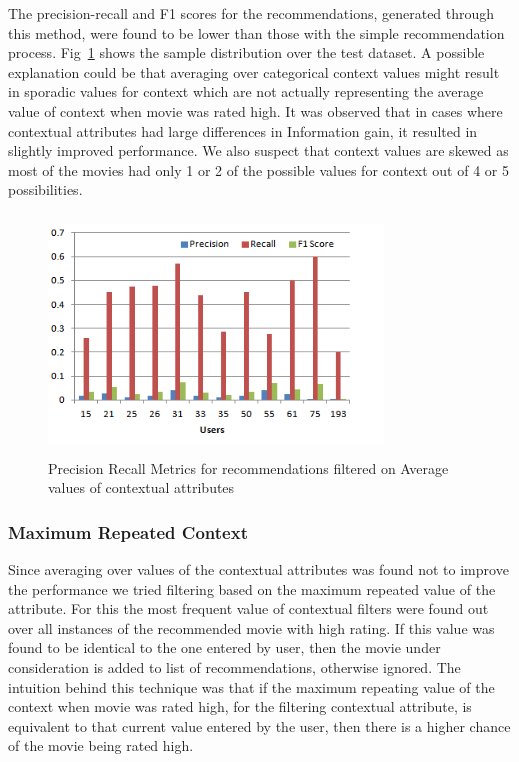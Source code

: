 \documentclass{article}
\begin{document}
The precision-recall and F1 scores for the recommendations, generated through this method, were found to be lower than those with the simple recommendation process. Fig~\ref{precrecallavg} shows the sample distribution over the test dataset. A possible explanation could be that averaging over categorical context values might result in sporadic values for context which are not actually representing the average value of context when movie was rated high. It was observed that in cases where contextual attributes had large differences in Information gain, it resulted in slightly improved performance. We also suspect that context values are skewed as most of the movies had only 1 or 2 of the possible values for context out of 4 or 5 possibilities.\\

\begin{figure}[H]
\includegraphics[height=2.5in, width=3.5in]{PrecRecallIG.png}
\caption{Precision Recall Metrics for recommendations filtered on Average values of contextual attributes}
\label{precrecallavg}
\end{figure}

\subsubsection{Maximum Repeated Context}

Since averaging over values of the contextual attributes was found not to improve the performance we tried filtering based on the maximum repeated value of the attribute. For this the most frequent value of contextual filters were found out over all instances of the recommended movie with high rating. If this value was found to be identical to the one entered by user, then the movie under consideration is added to list of recommendations, otherwise ignored. The intuition behind this technique was that if the maximum repeating value of the context when movie was rated high, for the filtering contextual attribute, is equivalent to that current value entered by the user, then there is a higher chance of the movie being rated high.\\
\end{document}
